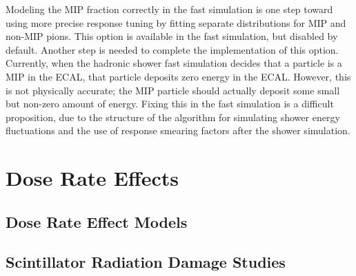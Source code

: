 Modeling the MIP fraction correctly in the fast simulation is one step toward using more precise response tuning by fitting separate distributions for MIP and non-MIP pions. This option is available in the fast simulation, but disabled by default. Another step is needed to complete the implementation of this option. Currently, when the hadronic shower fast simulation decides that a particle is a MIP in the ECAL, that particle deposits zero energy in the ECAL. However, this is not physically accurate; the MIP particle should actually deposit some small but non-zero amount of energy. Fixing this in the fast simulation is a difficult proposition, due to the structure of the algorithm for simulating shower energy fluctuations and the use of response smearing factors after the shower simulation.


\section{Dose Rate Effects}

\subsection{Dose Rate Effect Models}

\subsection{Scintillator Radiation Damage Studies}